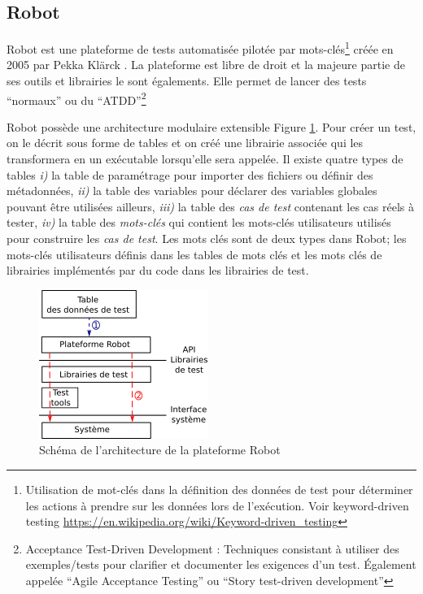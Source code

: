 \subsection{Robot}
\label{subsection:Robot}

Robot \citep{ROBOT_web} est une plateforme de tests automatisée pilotée par mots-clés\footnote{Utilisation de mot-clés dans la définition des données de test pour déterminer les actions à prendre sur les données lors de l'exécution. Voir keyword-driven testing  \url{https://en.wikipedia.org/wiki/Keyword-driven\_testing}} créée en 2005 par Pekka Klärck \citep{ROBOTlaukkanen2006data}. La plateforme est libre de droit et la majeure partie de ses outils et librairies le sont égalements. Elle permet de lancer des tests ``normaux'' ou du ``ATDD''\footnote{Acceptance Test-Driven Development \citep{ROBOTlarman2010practices}: Techniques consistant à utiliser des exemples/tests pour clarifier et documenter les exigences d'un test. Également appelée ``Agile Acceptance Testing'' ou ``Story test-driven development''}

Robot possède une architecture modulaire extensible
Figure \ref{Robot_arch}.  Pour créer un test, on le décrit sous forme de
tables et on créé une librairie associée qui les transformera en un
exécutable lorsqu'elle sera appelée. Il existe quatre types de tables
\textit{i)} la table de paramétrage pour importer des fichiers ou
définir des métadonnées, \textit{ii)} la table des variables pour
déclarer des variables globales pouvant être utilisées ailleurs,
\textit{iii)} la table des \textit{cas de test} contenant les cas
réels à tester, \textit{iv)} la table des \textit{mots-clés} qui
contient les mots-clés utilisateurs utilisés pour construire les
\textit{cas de test}.  Les mots clés sont de deux types dans Robot;
les mots-clés utilisateurs définis dans les tables de mots clés et les
mots clés de librairies implémentés par du code dans les librairies de
test.

\begin{figure}[H]
  \centering
  \includegraphics{Pictures/png/Robot_architecture}
  \caption{Schéma de l'architecture de la plateforme Robot}
  \label{Robot_arch}
\end{figure}

